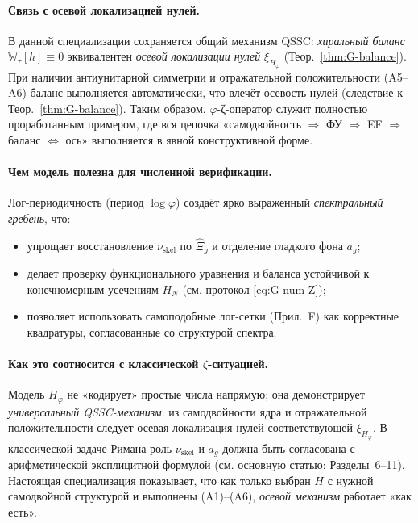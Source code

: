 \documentclass{article}
\numberwithin{equation}{section}
\theoremstyle{plain}
\theoremstyle{definition}
\theoremstyle{remark}
\def\Rightarrow{⇒}%
\def\Leftrightarrow{⇔}%
\begin{document}
\paragraph{Связь с осевой локализацией нулей.}
В данной специализации сохраняется общий механизм QSSC: \emph{хиральный баланс} \(\mathbb W_\tau[h]\equiv 0\) эквивалентен \emph{осевой локализации нулей} \(\xi_{H_\varphi}\) (Теор.~\ref{thm:G-balance}). При наличии антиунитарной симметрии и отражательной положительности (A5–A6) баланс выполняется автоматически, что влечёт осевость нулей (следствие к Теор.~\ref{thm:G-balance}). Таким образом, \(\varphi\)-ζ-оператор служит полностью проработанным примером, где вся цепочка «самодвойность \(\Rightarrow\) ФУ \(\Rightarrow\) EF \(\Rightarrow\) баланс \(\Leftrightarrow\) ось» выполняется в явной конструктивной форме.

\paragraph{Чем модель полезна для численной верификации.}
Лог-периодичность (период \(\log\varphi\)) создаёт ярко выраженный \emph{спектральный гребень}, что:
\begin{itemize}
\item упрощает восстановление \(\nu_{\mathrm{skel}}\) по \(\widehat{\Xi}_g\) и отделение гладкого фона \(a_g\);
\item делает проверку функционального уравнения и баланса устойчивой к конечномерным усечениям \(H_N\) (см. протокол \eqref{eq:G-num-Z});
\item позволяет использовать самоподобные лог-сетки (Прил.~F) как корректные квадратуры, согласованные со структурой спектра.
\end{itemize}

\paragraph{Как это соотносится с классической \(\zeta\)-ситуацией.}
Модель \(H_\varphi\) не «кодирует» простые числа напрямую; она демонстрирует \emph{универсальный QSSC-механизм}: из самодвойности ядра и отражательной положительности следует осевая локализация нулей соответствующей \(\xi_{H_\varphi}\). В классической задаче Римана роль \(\nu_{\mathrm{skel}}\) и \(a_g\) должна быть согласована с арифметической эксплицитной формулой (см. основную статью: Разделы~6–11). Настоящая специализация показывает, что как только выбран \(H\) с нужной самодвойной структурой и выполнены (A1)–(A6), \emph{осевой механизм} работает «как есть».
\end{document}
